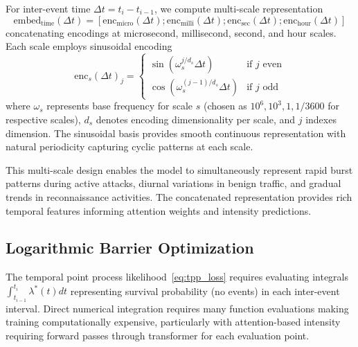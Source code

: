 \documentclass[10pt,journal,compsoc]{IEEEtran}
\begin{document}
For inter-event time $\Delta t = t_i - t_{i-1}$, we compute multi-scale representation
\begin{equation}
\text{embed}_{\text{time}}(\Delta t) = \left[\text{enc}_{\text{micro}}(\Delta t); \text{enc}_{\text{milli}}(\Delta t); \text{enc}_{\text{sec}}(\Delta t); \text{enc}_{\text{hour}}(\Delta t)\right]
\end{equation}
concatenating encodings at microsecond, millisecond, second, and hour scales. Each scale employs sinusoidal encoding
\begin{equation}
\text{enc}_s(\Delta t)_j = \begin{cases}
\sin(\omega_s^{j/d_s} \Delta t) & \text{if } j \text{ even} \\
\cos(\omega_s^{(j-1)/d_s} \Delta t) & \text{if } j \text{ odd}
\end{cases}
\end{equation}
where $\omega_s$ represents base frequency for scale $s$ (chosen as $10^6, 10^3, 1, 1/3600$ for respective scales), $d_s$ denotes encoding dimensionality per scale, and $j$ indexes dimension. The sinusoidal basis provides smooth continuous representation with natural periodicity capturing cyclic patterns at each scale.

This multi-scale design enables the model to simultaneously represent rapid burst patterns during active attacks, diurnal variations in benign traffic, and gradual trends in reconnaissance activities. The concatenated representation provides rich temporal features informing attention weights and intensity predictions.

\subsection{Logarithmic Barrier Optimization}

The temporal point process likelihood~\eqref{eq:tpp_loss} requires evaluating integrals $\int_{t_{i-1}}^{t_i} \lambda^*(t) dt$ representing survival probability (no events) in each inter-event interval. Direct numerical integration requires many function evaluations making training computationally expensive, particularly with attention-based intensity requiring forward passes through transformer for each evaluation point.
\end{document}
